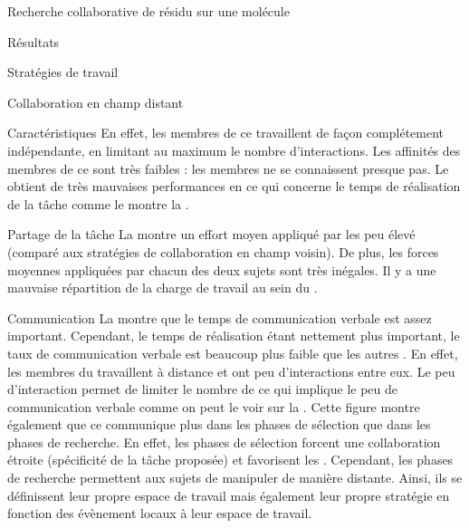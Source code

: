 \documentclass[myfrancais,ngerman,english,french]{mythesis}
\begin{document}
\begin{mychapter}{Recherche collaborative de résidu sur une molécule}
\begin{mysection}{Résultats}
\begin{mysubsection}{Stratégies de travail}
\begin{mysubsubsection}{Collaboration en champ distant}
\begin{myparagraph}{Caractéristiques}
						En effet, les membres de ce  travaillent de façon complétement indépendante, en limitant au maximum le nombre d'interactions.
						Les affinités des membres de ce  sont très faibles  : les membres ne se connaissent presque pas.
						Le  obtient de très mauvaises performances en ce qui concerne le temps de réalisation de la tâche comme le montre la .
					\end{myparagraph}
					\begin{myparagraph}{Partage de la tâche}
						La  montre un effort moyen appliqué par les  peu élevé (comparé aux stratégies de collaboration en champ voisin).
						De plus, les forces moyennes appliquées par chacun des deux sujets sont très inégales.
						Il y a une mauvaise répartition de la charge de travail au sein du .
					\end{myparagraph}
					\begin{myparagraph}{Communication}
						La  montre que le temps de communication verbale est assez important.
						Cependant, le temps de réalisation étant nettement plus important, le taux de communication verbale est beaucoup plus faible que les autres  .
						En effet, les membres du  travaillent à distance et ont peu d'interactions entre eux.
						Le peu d'interaction permet de limiter le nombre de  ce qui implique le peu de communication verbale comme on peut le voir sur la .
						Cette figure montre également que ce  communique plus dans les phases de sélection que dans les phases de recherche.
						En effet, les phases de sélection forcent une collaboration étroite (spécificité de la tâche proposée) et favorisent les .
						Cependant, les phases de recherche permettent aux sujets de manipuler de manière distante.
						Ainsi, ils se définissent leur propre espace de travail mais également leur propre stratégie en fonction des évènement locaux à leur espace de travail.

\end{myparagraph}
\end{mysubsubsection}
\end{mysubsection}
\end{mysection}
\end{mychapter}
\end{document}
